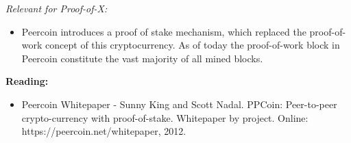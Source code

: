  

\emph{Relevant for Proof-of-X:}
\begin{itemize}
\item Peercoin introduces a proof of stake mechanism, which replaced the proof-of-work concept of this cryptocurrency. As of today the proof-of-work block in Peercoin constitute the vast majority of all mined blocks. 
\end{itemize}

\textbf{Reading:}
\begin{itemize}
\item  Peercoin Whitepaper - Sunny King and Scott Nadal. PPCoin: Peer-to-peer crypto-currency with proof-of-stake. Whitepaper by project. Online: https://peercoin.net/whitepaper, 2012.
\end{itemize}
